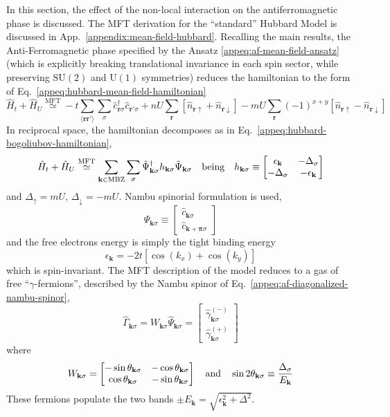 In this section, the effect of the non-local interaction on the antiferromagnetic phase is discussed. The MFT derivation for the ``standard'' Hubbard Model is discussed in App.~\ref{appendix:mean-field-hubbard}. Recalling the main results, the Anti-Ferromagnetic phase specified by the Ansatz \eqref{appeq:af-mean-field-ansatz} (which is explicitly breaking translational invariance in each spin sector, while preserving $\mathrm{SU}(2)$ and $\mathrm{U}(1)$ symmetries) reduces the hamiltonian to the form of Eq.~\eqref{appeq:hubbard-mean-field-hamiltonian}
\[
	\hat H_t + \hat H_U \stackrel{\mathrm{MFT}}{\simeq} -t \sum_{\langle \mathbf{r}\mathbf{r}' \rangle} \sum_\sigma \hat c_{\mathbf{r}\sigma}^\dagger \hat c_{\mathbf{r}'\sigma}
	+ nU \sum_\mathbf{r} \left[
	\hat n_{\mathbf{r}\uparrow} + \hat n_{\mathbf{r}\downarrow}
	\right] - mU \sum_\mathbf{r} (-1)^{x+y} \left[
	\hat n_{\mathbf{r}\uparrow} - \hat n_{\mathbf{r}\downarrow}
	\right]
\]
In reciprocal space, the hamiltonian decomposes as in Eq.~\eqref{appeq:hubbard-bogoliubov-hamiltonian},
\[
	\hat H_t + \hat H_U \stackrel{\mathrm{MFT}}{\simeq} \sum_{\mathbf{k} \in \mathrm{MBZ}} \sum_\sigma \hat \Psi_{\mathbf{k}\sigma}^\dagger h_{\mathbf{k}\sigma} \hat \Psi_{\mathbf{k}\sigma}
	\qq{being}
	h_{\mathbf{k}\sigma} \equiv \begin{bmatrix}
		\epsilon_\mathbf{k} & -\Delta_\sigma \\
		-\Delta_\sigma & - \epsilon_\mathbf{k}
	\end{bmatrix}
\]
and $\Delta_\uparrow = mU$, $\Delta_\downarrow = -mU$. Nambu spinorial formulation is used,
\[
	\hat \Psi_{\mathbf{k}\sigma} \equiv \begin{bmatrix}
		\hat c_{\mathbf{k}\sigma} \\
		\hat c_{\mathbf{k}+\bm{\pi}\sigma} 
	\end{bmatrix}
\]
and the free electrons energy is simply the tight binding energy
\[
	\epsilon_\mathbf{k} = -2t \left[
		\cos (k_x) + \cos (k_y)
	\right]
\]
which is spin-invariant. The MFT description of the model reduces to a gas of free ``$\gamma$-fermions'', described by the Nambu spinor of Eq.~\eqref{appeq:af-diagonalized-nambu-spinor},
\[
	\hat\Gamma_{\mathbf{k}\sigma} = W_{\mathbf{k}\sigma} \hat \Psi_{\mathbf{k}\sigma} = \begin{bmatrix}
		\hat \gamma_{\mathbf{k}\sigma}^{(-)} \\ \hat \gamma_{\mathbf{k}\sigma}^{(+)}
	\end{bmatrix}
\]
where
\[
	W_{\mathbf{k}\sigma} = \begin{bmatrix}
		- \sin \theta_{\mathbf{k}\sigma} & - \cos \theta_{\mathbf{k}\sigma} \\ 
		\cos \theta_{\mathbf{k}\sigma} & - \sin \theta_{\mathbf{k}\sigma}
	\end{bmatrix}
	\qq{and}
	\sin 2\theta_{\mathbf{k}\sigma} \equiv \frac{\Delta_\sigma}{E_\mathbf{k}}
\]
These fermions populate the two bands $\pm E_\mathbf{k} = \sqrt{\epsilon_\mathbf{k}^2 + \Delta^2}$.

